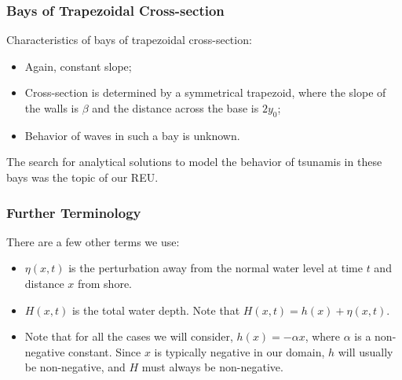 
	\begin{frame}
		\frametitle{Bays of Trapezoidal Cross-section}
		Characteristics of bays of trapezoidal cross-section:
		\begin{itemize}
			\item Again, constant slope;
			\item Cross-section is determined by a symmetrical trapezoid, where the slope of the walls is $\beta$ and the distance across the base is $2 y_0$;
			\item Behavior of waves in such a bay is unknown. 
		\end{itemize}
		The search for analytical solutions to model the behavior of tsunamis in these bays was the topic of our REU.
	\end{frame}

	\begin{frame}
		\frametitle{Further Terminology}
		There are a few other terms we use:
		\begin{itemize}
			\item $\eta(x,t)$ is the perturbation away from the normal water level at time $t$ and distance $x$ from shore.
			\item $H(x,t)$ is the total water depth. Note that $H(x,t) = h(x) + \eta(x,t)$.
			\item Note that for all the cases we will consider, $h(x) = -\alpha x$, where $\alpha$ is a non-negative constant. Since $x$ is typically negative in our domain, $h$ will usually be non-negative, and $H$ must always be non-negative.
		\end{itemize}
	\end{frame}

